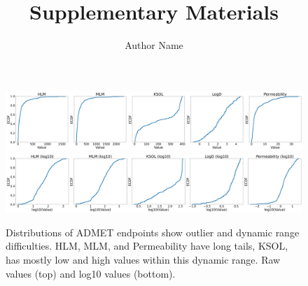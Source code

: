 \documentclass{article}
\title{Supplementary Materials}
\author{Author Name}
\begin{document}
\maketitle

\begin{figure}
    \includegraphics[scale=0.175]{04_figs_leaderboards/admet_endpoints.png}
    \includegraphics[scale=0.175]{04_figs_leaderboards/admet_endpoints_log10.png}
  \caption{Distributions of ADMET endpoints show outlier and dynamic range difficulties.  HLM, MLM, and Permeability have long tails, KSOL, has mostly low and high values within this dynamic range.  Raw values (top) and log10 values (bottom).}
  \label{fgr:admet_endpoints}
\end{figure}
\end{document}
